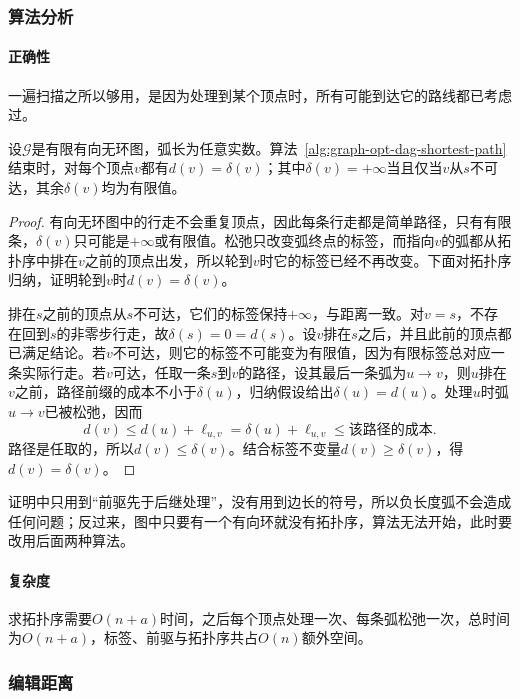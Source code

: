 \subsubsection{算法分析}

\paragraph{正确性}
一遍扫描之所以够用，是因为处理到某个顶点时，所有可能到达它的路线都已考虑过。

\begin{theorem}[有向无环图上最短路的正确性]
\label{thm:graph-opt-dag-shortest-path}
设$\mathcal G$是有限有向无环图，弧长为任意实数。算法~\ref{alg:graph-opt-dag-shortest-path}结束时，对每个顶点$v$都有$d(v)=\delta(v)$；其中$\delta(v)=+\infty$当且仅当$v$从$s$不可达，其余$\delta(v)$均为有限值。
\end{theorem}

\begin{proof}
有向无环图中的行走不会重复顶点，因此每条行走都是简单路径，只有有限条，$\delta(v)$只可能是$+\infty$或有限值。松弛只改变弧终点的标签，而指向$v$的弧都从拓扑序中排在$v$之前的顶点出发，所以轮到$v$时它的标签已经不再改变。下面对拓扑序归纳，证明轮到$v$时$d(v)=\delta(v)$。

排在$s$之前的顶点从$s$不可达，它们的标签保持$+\infty$，与距离一致。对$v=s$，不存在回到$s$的非零步行走，故$\delta(s)=0=d(s)$。设$v$排在$s$之后，并且此前的顶点都已满足结论。若$v$不可达，则它的标签不可能变为有限值，因为有限标签总对应一条实际行走。若$v$可达，任取一条$s$到$v$的路径，设其最后一条弧为$u\to v$，则$u$排在$v$之前，路径前缀的成本不小于$\delta(u)$，归纳假设给出$\delta(u)=d(u)$。处理$u$时弧$u\to v$已被松弛，因而
\[
  d(v)\leq d(u)+\ell_{u,v}=\delta(u)+\ell_{u,v}\leq\text{该路径的成本}.
\]
路径是任取的，所以$d(v)\leq\delta(v)$。结合标签不变量$d(v)\geq\delta(v)$，得$d(v)=\delta(v)$。
\end{proof}

证明中只用到“前驱先于后继处理”，没有用到边长的符号，所以负长度弧不会造成任何问题；反过来，图中只要有一个有向环就没有拓扑序，算法无法开始，此时要改用后面两种算法。

\paragraph{复杂度}
求拓扑序需要$O(n+a)$时间，之后每个顶点处理一次、每条弧松弛一次，总时间为$O(n+a)$，标签、前驱与拓扑序共占$O(n)$额外空间。

\subsubsection{编辑距离}

